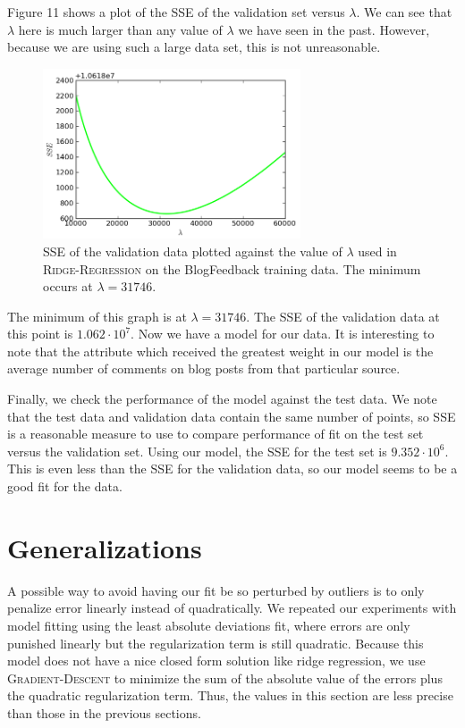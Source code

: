 \documentclass{sigchi}
\begin{document}
Figure 11 shows a plot of the SSE of the validation set versus $\lambda$. We can see that $\lambda$ here is much larger than any value of $\lambda$ we have seen in the past. However, because we are using such a large data set, this is not unreasonable.

\begin{figure}[!]
\centering
\includegraphics[width=3in]{big_plot.png}
\caption{SSE of the validation data plotted against the value of $\lambda$ used in \textsc{Ridge-Regression} on the BlogFeedback training data. The minimum occurs at $\lambda = 31746$.}
\end{figure}

The minimum of this graph is at $\lambda = 31746$. The SSE of the validation data at this point is $1.062 \cdot 10^7$. Now we have a model for our data. It is interesting to note that the attribute which received the greatest weight in our model is the average number of comments on blog posts from that particular source.

Finally, we check the performance of the model against the test data. We note that the test data and validation data contain the same number of points, so SSE is a reasonable measure to use to compare performance of fit on the test set versus the validation set. Using our model, the SSE for the test set is $9.352 \cdot 10^6$. This is even less than the SSE for the validation data, so our model seems to be a good fit for the data.

\section{Generalizations}


A possible way to avoid having our fit be so perturbed by outliers is to only penalize error linearly instead of quadratically. We repeated our experiments with model fitting using the least absolute deviations fit, where errors are only punished linearly but the regularization term is still quadratic. Because this model does not have a nice closed form solution like ridge regression, we use \textsc{Gradient-Descent} to minimize the sum of the absolute value of the errors plus the quadratic regularization term. Thus, the values in this section are less precise than those in the previous sections.
\end{document}
